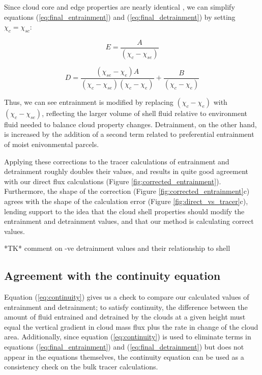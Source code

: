 \documentclass[12pt]{article}
\begin{document}
Since cloud core and edge properties are nearly identical , we can simplify 
equations (\ref{eq:final_entrainment}) and (\ref{eq:final_detrainment}) by 
setting $\chi_{c} = \chi_{sc}$:

\begin{equation}
  \label{eq:simplified_entrainment}
    E = \frac{A}{(\chi_c - \chi_{se})}
\end{equation}

\begin{equation}
  \label{eq:simplified_detrainment}
    D = \frac{(\chi_{se} - \chi_e)A}{(\chi_c - \chi_{se})(\chi_c - \chi_e)}
        + \frac{B}{(\chi_c - \chi_e)}
\end{equation}

Thus, we can see entrainment is modified by replacing $(\chi_c - \chi_e)$ with 
$(\chi_c - \chi_{se})$, reflecting the larger volume of shell fluid relative to
environment fluid needed to balance cloud property changes.  Detrainment, on 
the other hand, is increased by the addition of a second term related to
preferential entrainment of moist enivonmental parcels.

Applying these corrections to the tracer calculations of entrainment and 
detrainment roughly doubles their values, and results in quite good agreement 
with our direct flux calculations (Figure \ref{fig:corrected_entrainment}).  
Furthermore, the shape of the correction (Figure 
\ref{fig:corrected_entrainment}c) agrees with the shape of the calculation 
error (Figure \ref{fig:direct_vs_tracer}c), lending support to the idea that 
the cloud shell properties should modify the entrainment and detrainment
values, and that our method is calculating correct values.

*TK* comment on -ve detrainment values and their relationship to shell


\subsection{Agreement with the continuity equation}

Equation (\ref{eq:continuity}) gives us a check to compare our calculated 
values of entrainment and detrainment; to satisfy continuity, the difference 
between the amount of fluid entrained and detrained by the clouds at a given 
height must equal the vertical gradient in cloud mass flux plus the rate in 
change of the cloud area.  Additionally, since equation (\ref{eq:continuity}) 
is used to eliminate terms in equations (\ref{eq:final_entrainment}) and 
(\ref{eq:final_detrainment}) but does not appear in the equations themselves, 
the continuity equation can be used as a consistency check on the bulk tracer 
calculations.
\end{document}
